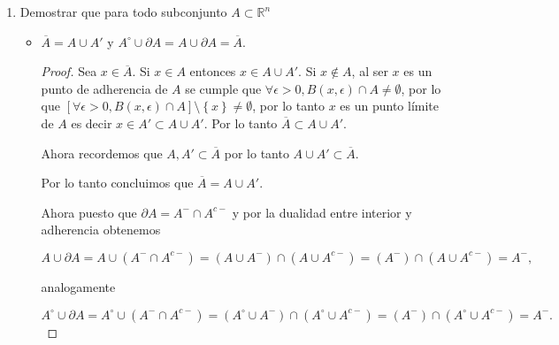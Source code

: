 \documentclass[letterpaper]{article}
\theoremstyle{definition}
\theoremstyle{lemathm}
\theoremstyle{lemathm}
\newtheorem{sol}{Solución}
\theoremstyle{lemathm}
\theoremstyle{lemademthm}
\newcommand{\pars}[1]{\left( #1 \right) }
\newcommand{\bracs}[1]{\left[ #1 \right] }
\newcommand{\set}[1]{\left \{ #1 \right\} }
\newcommand{\RR}{\mathbb{R}}
\newcommand{\1}{\mathbbm{1}}
\begin{document}
\begin{enumerate}
\begin{itemize}
\begin{sol}
				Primero veamos que si $A\subset B$ entonces si $V$ es un conjunot tal que $B \subset V$ entonces $A \subset V$ y como $\overline{B} = \bigcap\set{V|B\subset V, V \text{ es cerrado en } \RR^n}$ y $\overline{A} = \bigcap\set{V|A\subset V, V \text{ es cerrado en } \RR^n}$ entonces $\overline{A} \subset \overline{B}$. Ahora como $A_{\alpha} \subset \bigcup_{\alpha\in\Omega} A_{\alpha}$ entonces tenemos que $\overline{A_{\alpha}} \subset \overline{\bigcup_{\alpha\in\Omega} A_{\alpha}}$ para todo $\alpha \in \Omega$, por lo tanto $\bigcup_{\alpha\in\Omega}\overline{A_\alpha} \subset \overline{\bigcup_{\alpha\in\Omega}A_{\alpha}}$.

			\end{sol}


		\end{itemize}

		\item Demostrar que para todo subconjunto $A\subset\RR^n$
		
		\begin{itemize}
			\item $\overline{A} = A \cup A'$ y $A^{\circ}\cup\partial A = A\cup\partial A = \overline{A}$.
			
			\begin{proof}
				
				Sea $x\in\overline{A}$. Si $x\in A$ entonces $x\in A\cup A'$. Si $x\not\in A$, al ser $x$ es un punto de adherencia de $A$ se cumple que $\forall \epsilon > 0, B\pars{x,\epsilon}\cap A \neq \emptyset$, por lo que $\bracs{\forall \epsilon > 0, B\pars{x,\epsilon}\cap A}\setminus\set{x} \neq \emptyset$, por lo tanto $x$ es un punto límite de $A$ es decir $x\in A'\subset A\cup A'$. Por lo tanto $\overline{A} \subset A\cup A'$.
	
				Ahora recordemos que $A,A' \subset \overline{A}$ por lo tanto $A\cup A' \subset \overline{A}$.
	
				Por lo tanto concluimos que $\overline{A} = A\cup A'$.
	
				Ahora puesto que $\partial A = A^{-} \cap A^{c-}$ y por la dualidad entre interior y adherencia obtenemos
	
				\[A \cup \partial A = A \cup \pars{A^{-}\cap A^{c-}} = \pars{A \cup A^{-}} \cap \pars{A \cup A^{c-}} = \pars{A^{-}} \cap \pars{A \cup A^{c-}} = A^{-},\]
	
				analogamente
	
				\[A^{\circ} \cup \partial A = A^{\circ} \cup \pars{A^{-}\cap A^{c-}} = \pars{A^{\circ} \cup A^{-}} \cap \pars{A^{\circ} \cup A^{c-}} = \pars{A^{-}} \cap \pars{A^{\circ} \cup A^{c-}} = A^{-}.\]


\end{proof}
\end{itemize}
\end{enumerate}
\end{document}
